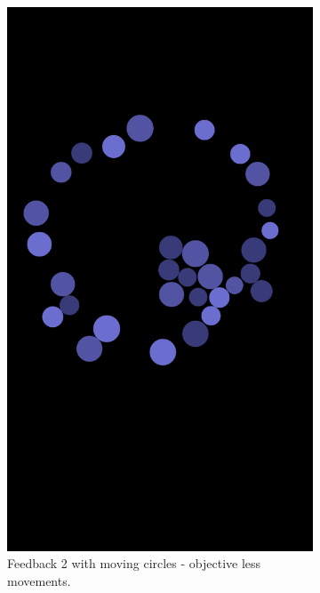 \documentclass[a4paper,10pt,english,lof,lot,twoside]{puthesis}
\begin{document}
\begin{figure}
\begin{subfigure}[t]{0.30\linewidth}
\includegraphics[width=0.800\linewidth]{final-prototype-feedback-2-circles.png}
\caption[Moving circles.]{Feedback 2 with moving circles - objective less movements.}\label{ch-design/index:fig-final-prototype-feedback-2-circles}\end{subfigure}
\begin{subfigure}[t]{0.30\linewidth}
\centering
\capstart


\end{subfigure}
\end{figure}
\end{document}
